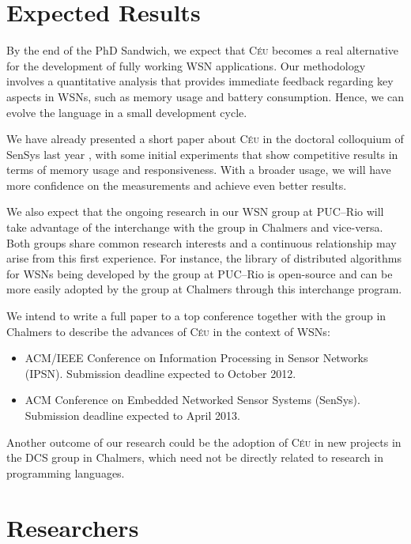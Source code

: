 \documentclass[pdftex,12pt,a4paper]{article}
\newcommand{\CEU}{\textsc{C\'{e}u}}
\begin{document}
\section{Expected Results}

By the end of the PhD Sandwich, we expect that \CEU{} becomes a real 
alternative for the development of fully working WSN applications.
Our methodology involves a quantitative analysis that provides immediate 
feedback regarding key aspects in WSNs, such as memory usage and battery 
consumption.
Hence, we can evolve the language in a small development cycle.

We have already presented a short paper about \CEU{} in the doctoral colloquium 
of SenSys last year \cite{ceu.sensys11}, with some initial experiments that 
show competitive results in terms of memory usage and responsiveness.
With a broader usage, we will have more confidence on the measurements and 
achieve even better results.

We also expect that the ongoing research in our WSN group at PUC--Rio will take 
advantage of the interchange with the group in Chalmers and vice-versa.
Both groups share common research interests and a continuous relationship may 
arise from this first experience.
For instance, the library of distributed algorithms for WSNs being developed by 
the group at PUC--Rio is open-source and can be more easily adopted by the 
group at Chalmers through this interchange program.

We intend to write a full paper to a top conference together with the group in 
Chalmers to describe the advances of \CEU{} in the context of WSNs:

\begin{itemize}
\item ACM/IEEE Conference on Information Processing in Sensor Networks (IPSN).  
      Submission deadline expected to October 2012.
\item ACM Conference on Embedded Networked Sensor Systems (SenSys).
      Submission deadline expected to April 2013.
\end{itemize}

Another outcome of our research could be the adoption of \CEU{} in new projects 
in the DCS group in Chalmers, which need not be directly related to research in 
programming languages.

\section{Researchers}
\end{document}
